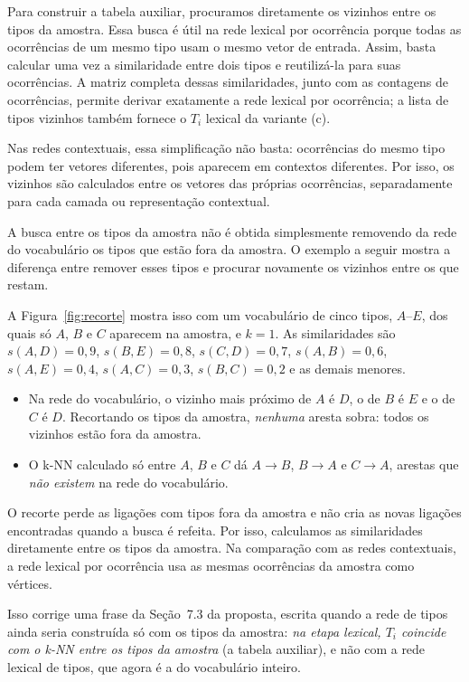 Para construir a tabela auxiliar, procuramos diretamente os vizinhos entre os tipos da amostra.
Essa busca é útil na rede lexical por ocorrência porque todas as ocorrências de um mesmo tipo
usam o mesmo vetor de entrada. Assim, basta calcular uma vez a similaridade entre dois tipos e
reutilizá-la para suas ocorrências. A matriz completa dessas similaridades, junto com as
contagens de ocorrências, permite derivar exatamente a rede lexical por ocorrência; a lista de
tipos vizinhos também fornece o $T_i$ lexical da variante (c).

Nas redes contextuais, essa simplificação não basta: ocorrências do mesmo tipo podem ter vetores
diferentes, pois aparecem em contextos diferentes. Por isso, os vizinhos são calculados entre os
vetores das próprias ocorrências, separadamente para cada camada ou representação contextual.

A busca entre os tipos da amostra não é obtida simplesmente removendo da rede do vocabulário os
tipos que estão fora da amostra. O exemplo a seguir mostra a diferença entre remover esses tipos
e procurar novamente os vizinhos entre os que restam.

A Figura~\ref{fig:recorte} mostra isso com um
vocabulário de cinco tipos, $A$--$E$, dos quais só $A$, $B$ e $C$ aparecem na amostra, e $k=1$.
As similaridades são
$s(A,D)=0{,}9$, $s(B,E)=0{,}8$, $s(C,D)=0{,}7$, $s(A,B)=0{,}6$, $s(A,E)=0{,}4$,
$s(A,C)=0{,}3$, $s(B,C)=0{,}2$ e as demais menores.
\begin{itemize}
    \item Na rede do vocabulário, o vizinho mais próximo de $A$ é $D$, o de $B$ é $E$ e o de
    $C$ é $D$. Recortando os tipos da amostra, \emph{nenhuma} aresta sobra: todos os vizinhos
    estão fora da amostra.
    \item O k-NN calculado só entre $A$, $B$ e $C$ dá $A\to B$, $B\to A$ e $C\to A$, arestas que
    \emph{não existem} na rede do vocabulário.
\end{itemize}
O recorte perde as ligações com tipos fora da amostra e não cria as novas ligações encontradas
quando a busca é refeita. Por isso, calculamos as similaridades diretamente entre os tipos da
amostra. Na comparação com as redes contextuais, a rede lexical por ocorrência usa as mesmas
ocorrências da amostra como vértices.

Isso corrige uma frase da Seção~7.3 da proposta, escrita quando a rede de tipos ainda seria
construída só com os tipos da amostra: \emph{na etapa lexical, $T_i$ coincide com o k-NN entre
os tipos da amostra} (a tabela auxiliar), e não com a rede lexical de tipos, que agora é a do
vocabulário inteiro.

